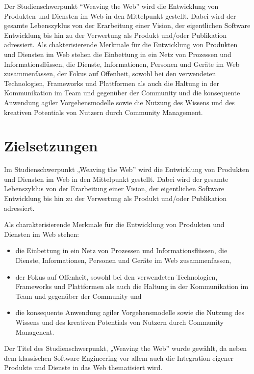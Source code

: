 Der Studienschwerpunkt ``Weaving the Web'' wird die Entwicklung von
Produkten und Diensten im Web in den Mittelpunkt gestellt. Dabei wird
der gesamte Lebenszyklus von der Erarbeitung einer Vision, der
eigentlichen Software Entwicklung bis hin zu der Verwertung als Produkt
und/oder Publikation adressiert. Als chakterisierende Merkmale für die
Entwicklung von Produkten und Diensten im Web stehen die Einbettung in
ein Netz von Prozessen und Informationsflüssen, die Dienste,
Informationen, Personen und Geräte im Web zusammenfassen, der Fokus auf
Offenheit, sowohl bei den verwendeten Technologien, Frameworks und
Plattformen als auch die Haltung in der Kommunikation im Team und
gegenüber der Community und die konsequente Anwendung agiler
Vorgehensmodelle sowie die Nutzung des Wissens und des kreativen
Potentials von Nutzern durch Community Management.

\section*{Zielsetzungen}\label{zielsetzungen-3}

Im Studienschwerpunkt „Weaving the Web'' wird die Entwicklung von
Produkten und Diensten im Web in den Mittelpunkt gestellt. Dabei wird
der gesamte Lebenszyklus von der Erarbeitung einer Vision, der
eigentlichen Software Entwicklung bis hin zu der Verwertung als Produkt
und/oder Publikation adressiert.

Als charakterisierende Merkmale für die Entwicklung von Produkten und
Diensten im Web stehen:

\begin{itemize}
\tightlist
\item
  die Einbettung in ein Netz von Prozessen und Informationsflüssen, die
  Dienste, Informationen, Personen und Geräte im Web zusammenfassen,
\item
  der Fokus auf Offenheit, sowohl bei den verwendeten Technologien,
  Frameworks und Plattformen als auch die Haltung in der Kommunikation
  im Team und gegenüber der Community und
\item
  die konsequente Anwendung agiler Vorgehensmodelle sowie die Nutzung
  des Wissens und des kreativen Potentials von Nutzern durch Community
  Managenent.
\end{itemize}

Der Titel des Studienschwerpunkt, „Weaving the Web'' wurde gewählt, da
neben dem klassischen Software Engineering vor allem auch die
Integration eigener Produkte und Dienste in das Web thematisiert wird.

